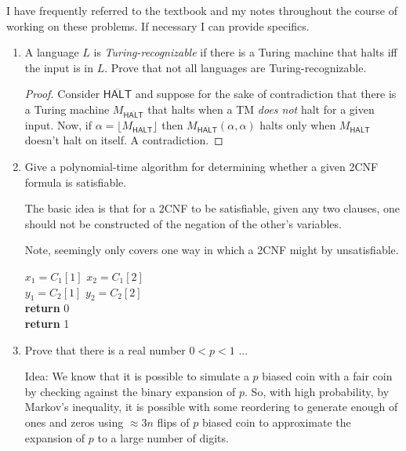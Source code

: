 \documentclass[usletter]{article}
\newcommand{\halt}[0]{
  \overline{\textsf{HALT}}
}
\begin{document}

I have frequently referred to the textbook \cite{textbook} and my notes throughout the course of working on these problems. If necessary I can provide specifics.

\begin{enumerate}
  \item A language $L$ is \textit{Turing-recognizable} if there is a Turing machine that halts iff the input is in $L$. Prove that not all languages are Turing-recognizable.
    \begin{proof}
      Consider $\halt$ and suppose for the sake of contradiction that there is a Turing machine $M_{\halt}$ that halts when a TM \textit{does not} halt for a given input. Now, if $\alpha = \lfloor M_{\halt} \rfloor $ then $M_{\halt}(\alpha, \alpha)$ halts only when $M_{\halt}$ doesn't halt on itself. A contradiction.
    \end{proof}

  \item Give a polynomial-time algorithm for determining whether a given 2CNF formula is satisfiable.

    The basic idea is that for a 2CNF to be satisfiable, given any two clauses, one should not be constructed of the negation of the other's variables.

    Note, seemingly only covers one way in which a 2CNF might by unsatisfiable.

    \begin{algorithm}
      \begin{algorithmic}[1]
        \State $x_1 = C_1[1]$
        \State $x_2 = C_1[2]$ \\
        \State $y_1 = C_2[1]$
        \State $y_2 = C_2[2]$ \\
        \State \textbf{return} 0
        \EndIf
        \EndFor
        \EndFor \\
        \State \textbf{return} 1
        \EndProcedure
      \end{algorithmic}
    \end{algorithm}

  \item Prove that there is a real number $0 < p < 1$ ...

    Idea: We know that it is possible to simulate a $p$ biased coin with a fair coin by checking against the binary expansion of $p$. So, with high probability, by Markov's inequality, it is possible with some reordering to generate enough of ones and zeros using $\approx 3n$ flips of $p$ biased coin to approximate the expansion of $p$ to a large number of digits.


\end{enumerate}
\end{document}
